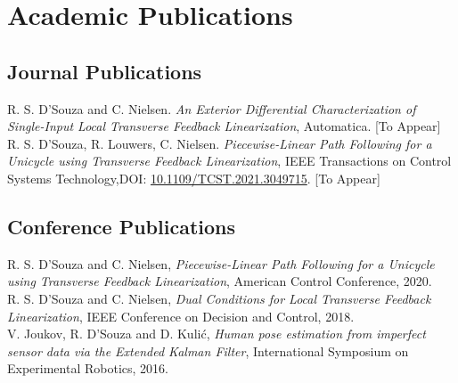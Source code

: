\documentclass[oneside, 10pt]{memoir}
\begin{document}
\section*{Academic Publications}

\subsection*{Journal Publications}
R. S. D'Souza and C. Nielsen. \emph{An Exterior Differential Characterization of Single-Input Local Transverse Feedback Linearization}, Automatica. [To Appear]\hspace*{\fill}\\[1em]
R. S. D'Souza, R. Louwers, C. Nielsen. \emph{Piecewise-Linear Path Following for a Unicycle using Transverse Feedback Linearization}, IEEE Transactions on Control Systems Technology,\hspace*{\fill}\linebreak DOI: \href{https://dx.doi.org/10.1109/TCST.2021.3049715}{10.1109/TCST.2021.3049715}. [To Appear]\hspace*{\fill}

\subsection*{Conference Publications}
R. S. D'Souza and C. Nielsen, \emph{Piecewise-Linear Path Following for a Unicycle using Transverse Feedback Linearization}, American Control Conference, 2020.\hspace*{\fill}\\[1em]
R. S. D'Souza and C. Nielsen, \emph{Dual Conditions for Local Transverse Feedback Linearization}, IEEE Conference on Decision and Control, 2018.\hspace*{\fill}\\[1em]
V. Joukov, R. D'Souza and D. Kuli\'{c}, \emph{Human pose estimation from imperfect sensor data via the Extended Kalman 
Filter}, International Symposium on Experimental Robotics, 2016.\hspace*{\fill}
\end{document}

